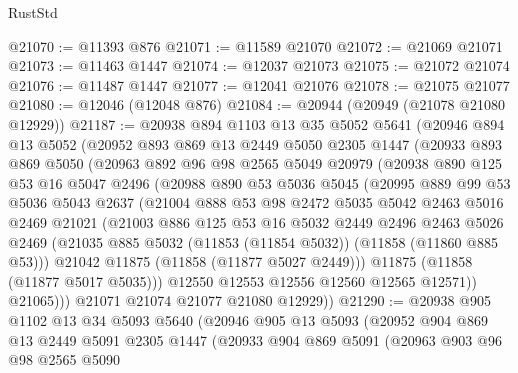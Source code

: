 \begin{lexlean}{RustStd}
\begin{coremodule}
@21070 := @11393 @876
@21071 := @11589 @21070
@21072 := @21069 @21071
@21073 := @11463 @1447
@21074 := @12037 @21073
@21075 := @21072 @21074
@21076 := @11487 @1447
@21077 := @12041 @21076
@21078 := @21075 @21077
@21080 := @12046 (@12048 @876)
@21084 := @20944 (@20949 (@21078 @21080 @12929))
@21187 := @20938
    @894
    @1103
    @13
    @35
    @5052
    @5641
    (@20946
      @894
      @13
      @5052
      (@20952
        @893
        @869
        @13
        @2449
        @5050
        @2305
        @1447
        (@20933
          @893
          @869
          @5050
          (@20963
            @892
            @96
            @98
            @2565
            @5049
            @20979
            (@20938
              @890
              @125
              @53
              @16
              @5047
              @2496
              (@20988
                @890
                @53
                @5036
                @5045
                (@20995
                  @889
                  @99
                  @53
                  @5036
                  @5043
                  @2637
                  (@21004
                    @888
                    @53
                    @98
                    @2472
                    @5035
                    @5042
                    @2463
                    @5016
                    @2469
                    @21021
                    (@21003
                      @886
                      @125
                      @53
                      @16
                      @5032
                      @2449
                      @2496
                      @2463
                      @5026
                      @2469
                      (@21035 @885 @5032 (@11853 (@11854 @5032)) (@11858 (@11860 @885 @53)))
                      @21042
                      @11875
                      (@11858 (@11877 @5027 @2449)))
                    @11875
                    (@11858 (@11877 @5017 @5035)))
                  @12550
                  @12553
                  @12556
                  @12560
                  @12565
                  @12571))
              @21065)))
        @21071
        @21074
        @21077
        @21080
        @12929))
@21290 := @20938
    @905
    @1102
    @13
    @34
    @5093
    @5640
    (@20946
      @905
      @13
      @5093
      (@20952
        @904
        @869
        @13
        @2449
        @5091
        @2305
        @1447
        (@20933
          @904
          @869
          @5091
          (@20963
            @903
            @96
            @98
            @2565
            @5090

\end{coremodule}
\end{lexlean}

